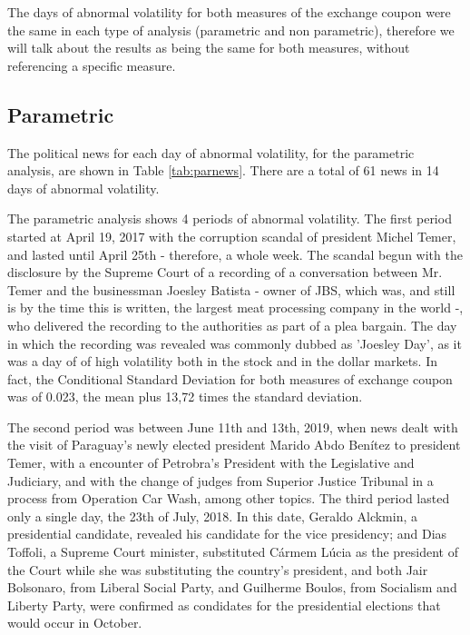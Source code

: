 \documentclass[cic,tc, english]{iiufrgs}
\begin{document}
    The days of abnormal volatility for both measures of the exchange coupon were the same in each type of analysis (parametric and non parametric), therefore we will talk about the results as being the same for both measures, without referencing a specific measure.

\subsection{Parametric}

    The political news for each day of abnormal volatility, for the parametric analysis, are shown in Table \ref{tab:parnews}. There are a total of 61 news in 14 days of abnormal volatility.

    

    The parametric analysis shows 4 periods of abnormal volatility. The first period started at April 19, 2017 with the corruption scandal of president Michel Temer, and lasted until April 25th - therefore, a whole week. The scandal begun with the disclosure by the Supreme Court of a recording of a conversation between Mr. Temer and the businessman Joesley Batista - owner of JBS, which was, and still is by the time this is written, the largest meat processing company in the world -, who delivered the recording to the authorities as part of a plea bargain. The day in which the recording was revealed was commonly dubbed as 'Joesley Day', as it was a day of of high volatility both in the stock and in the dollar markets. In fact, the Conditional Standard Deviation for both measures of exchange coupon was of 0.023, the mean plus 13,72 times the standard deviation.

    The second period was between June 11th and 13th, 2019, when news dealt with the visit of Paraguay's newly elected president Marido Abdo Benítez to president Temer, with a encounter of Petrobra's President with the Legislative and Judiciary, and with the change of judges from Superior Justice Tribunal in a process from Operation Car Wash, among other topics. The third period lasted only a single day, the 23th of July, 2018. In this date, Geraldo Alckmin, a presidential candidate, revealed his candidate for the vice presidency; and Dias Toffoli, a Supreme Court minister, substituted Cármem Lúcia as the president of the Court while she was substituting the country's president, and both Jair Bolsonaro, from Liberal Social Party, and Guilherme Boulos, from Socialism and Liberty Party, were confirmed as condidates for the presidential elections that would occur in October.
\end{document}
